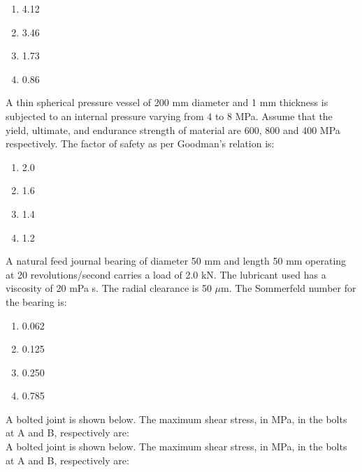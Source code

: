 \begin{enumerate}
    \item  4.12
    \item  3.46
    \item  1.73
    \item  0.86
\end{enumerate}
\bigskip
\item A thin spherical pressure vessel of 200 mm diameter and 1 mm thickness is subjected to an internal pressure varying from 4 to 8 MPa. Assume that the yield, ultimate, and endurance strength of material are 600, 800 and 400 MPa respectively. The factor of safety as per Goodman's relation is:
\begin{enumerate}
    \item  2.0
    \item  1.6
    \item  1.4
    \item  1.2
\end{enumerate}
\item A natural feed journal bearing of diameter 50 mm and length 50 mm operating at 20 revolutions/second carries a load of 2.0 kN. The lubricant used has a viscosity of 20 mPa s. The radial clearance is 50 $\mu$m. The Sommerfeld number for the bearing is:
\begin{enumerate}
    \item  0.062
    \item  0.125
    \item  0.250
    \item  0.785
\end{enumerate}
\bigskip
\item A bolted joint is shown below. The maximum shear stress, in MPa, in the bolts at A and B, respectively are:\\
A bolted joint is shown below. The maximum shear stress, in MPa, in the bolts at A and B, respectively are:
